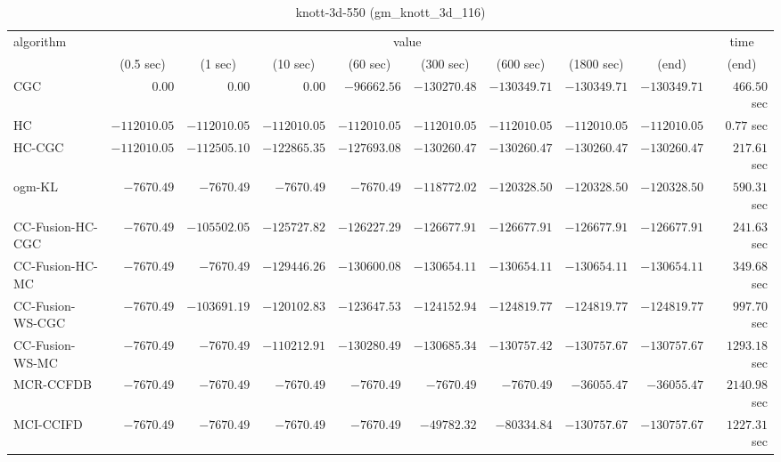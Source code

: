 \begin{table}[H]
\scriptsize
\centering
\caption{knott-3d-550 (gm\_knott\_3d\_116)}
\label{tab:anytimetable-knott-3d-550-gm-knott-3d-116}
\begin{tabular}{lrrrrrrrrr}
\toprule
           algorithm &                                   \multicolumn{8}{c}{value} & \multicolumn{1}{c}{time}   \\  
\cmidrule(lr){2-9}\cmidrule(lr){10-10}   
                     & \multicolumn{1}{c}{(0.5 sec)} & \multicolumn{1}{c}{(1 sec)} & \multicolumn{1}{c}{(10 sec)} & \multicolumn{1}{c}{(60 sec)} & \multicolumn{1}{c}{(300 sec)} & \multicolumn{1}{c}{(600 sec)} & \multicolumn{1}{c}{(1800 sec)} & \multicolumn{1}{c}{(end)} & \multicolumn{1}{c}{(end)}   \\ \midrule 
                 CGC & $         0.00$ & $         0.00$ & $         0.00$ & $    -96662.56$ & $   -130270.48$ & $   -130349.71$ & $   -130349.71$ & $   -130349.71$ & $       466.50$ sec   \\ 
                  HC & $   -112010.05$ & $   -112010.05$ & $   -112010.05$ & $   -112010.05$ & $   -112010.05$ & $   -112010.05$ & $   -112010.05$ & $   -112010.05$ & $         0.77$ sec   \\ 
              HC-CGC & $   -112010.05$ & $   -112505.10$ & $   -122865.35$ & $   -127693.08$ & $   -130260.47$ & $   -130260.47$ & $   -130260.47$ & $   -130260.47$ & $       217.61$ sec   \\ 
              ogm-KL & $     -7670.49$ & $     -7670.49$ & $     -7670.49$ & $     -7670.49$ & $   -118772.02$ & $   -120328.50$ & $   -120328.50$ & $   -120328.50$ & $       590.31$ sec   \\ 
    CC-Fusion-HC-CGC & $     -7670.49$ & $   -105502.05$ & $   -125727.82$ & $   -126227.29$ & $   -126677.91$ & $   -126677.91$ & $   -126677.91$ & $   -126677.91$ & $       241.63$ sec   \\ 
     CC-Fusion-HC-MC & $     -7670.49$ & $     -7670.49$ & $   -129446.26$ & $   -130600.08$ & $   -130654.11$ & $   -130654.11$ & $   -130654.11$ & $   -130654.11$ & $       349.68$ sec   \\ 
    CC-Fusion-WS-CGC & $     -7670.49$ & $   -103691.19$ & $   -120102.83$ & $   -123647.53$ & $   -124152.94$ & $   -124819.77$ & $   -124819.77$ & $   -124819.77$ & $       997.70$ sec   \\ 
     CC-Fusion-WS-MC & $     -7670.49$ & $     -7670.49$ & $   -110212.91$ & $   -130280.49$ & $   -130685.34$ & $   -130757.42$ & $   -130757.67$ & $   -130757.67$ & $      1293.18$ sec   \\ 
\cmidrule{1-1} 
           MCR-CCFDB & $     -7670.49$ & $     -7670.49$ & $     -7670.49$ & $     -7670.49$ & $     -7670.49$ & $     -7670.49$ & $    -36055.47$ & $    -36055.47$ & $      2140.98$ sec   \\ 
\cmidrule{1-1} 
           MCI-CCIFD & $     -7670.49$ & $     -7670.49$ & $     -7670.49$ & $     -7670.49$ & $    -49782.32$ & $    -80334.84$ & $   -130757.67$ & $   -130757.67$ & $      1227.31$ sec   \\ 
\bottomrule
\end{tabular}
\end{table}

